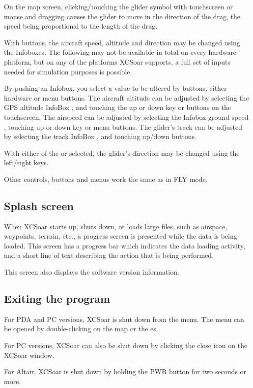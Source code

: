 On the map screen, clicking/touching the glider symbol
with touchscreen or mouse and dragging 
causes the glider to move in the direction of the drag, the
speed being proportional to the length of the drag.

With buttons, the aircraft
speed, altitude and direction may be changed using the Infoboxes.
The following may not be available in total on every hardware platform, but on 
any of the platforms XCSoar supports, a full set of inputs needed for 
simulation purposes is possible.

By pushing an Infobox, you select a value to be altered by buttons, either 
 hardware or menu buttons.
The aircraft altitude can be adjusted by selecting the GPS altitude
InfoBox , and touching the up or down key or buttons on the 
touchscreen.
The airspeed can be adjusted by selecting the Infobox ground speed
, touching up or down key or menu buttons.
The glider's track  can be adjusted by selecting the track InfoBox
, and touching up/down buttons.

With either of the  or 
selected, the glider's direction may be changed using the left/right keys.

Other controls, buttons and menus work the same as in FLY mode.


\subsection*{Splash screen}
When XCSoar starts up, shuts down, or loads large files, such as airspace,
waypoints, terrain, etc., a progress screen is presented while the data is being
loaded. This screen has a progress bar which indicates the data loading
activity, and a short line of text describing the action that is being performed.

This screen also displays the software version information.

\subsection*{Exiting the program}
For PDA and PC versions, XCSoar is shut down from the menu. The menu can be
opened by double-clicking on the map or the \InfoBox es.
\begin{quote}
\end{quote}

For PC versions, XCSoar can also be shut down by clicking the close icon
on the XCSoar window.

For Altair, XCSoar is shut down by holding the PWR button for two seconds or
more.

